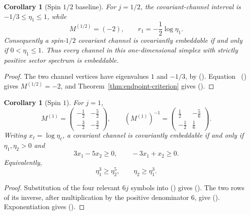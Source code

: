 \documentclass[twoside,10pt]{article}
\numberwithin{equation}{section}
\theoremstyle{slbody}
\newtheorem{corollary}[theorem]{Corollary}
\theoremstyle{definition}
\theoremstyle{remark}
\renewcommand{\eqref}[1]{%
  \textup{{\normalfont(\oldstylenums{\ref{#1}}}\normalfont)}}
\begin{document}
\begin{corollary}[Spin \(1/2\) baseline]\label{cor:spin-one-half}
For \(j=1/2\), the covariant-channel interval is
\(-1/3\leq\eta_1\leq1\), while
\begin{equation}\label{eq:spin-one-half-criterion}
 M^{(1/2)}=(-2),\qquad
 r_1=-\frac12\log\eta_1.
\end{equation}
Consequently a spin-\(1/2\) covariant channel is covariantly
embeddable if and only if \(0<\eta_1\leq1\).  Thus every channel in
this one-dimensional simplex with strictly positive sector spectrum is
embeddable.
\end{corollary}

\begin{proof}
The two channel vertices have eigenvalues \(1\) and \(-1/3\), by
\eqref{eq:vertex-eigenvalues}.  Equation~\eqref{eq:M-definition}
gives \(M^{(1/2)}=-2\), and Theorem~\ref{thm:endpoint-criterion}
gives \eqref{eq:spin-one-half-criterion}.
\end{proof}

\begin{corollary}[Spin \(1\)]\label{cor:spin-one}
For \(j=1\),
\begin{equation}\label{eq:M-spin-one}
 M^{(1)}=
 \begin{pmatrix}
 -\tfrac12&-\tfrac52\\
 -\tfrac32&-\tfrac32
 \end{pmatrix},
 \qquad
 (M^{(1)})^{-1}=
 \begin{pmatrix}
 \tfrac12&-\tfrac56\\
 -\tfrac12&\tfrac16
 \end{pmatrix}.
\end{equation}
Writing \(x_\ell=\log\eta_\ell\), a covariant channel is covariantly
embeddable if and only if \(\eta_1,\eta_2>0\) and
\begin{equation}\label{eq:spin-one-facets}
 3x_1-5x_2\geq0,
 \qquad -3x_1+x_2\geq0.
\end{equation}
Equivalently,
\begin{equation}\label{eq:spin-one-multiplicative}
 \eta_1^3\geq\eta_2^5,
 \qquad \eta_2\geq\eta_1^3.
\end{equation}
\end{corollary}

\begin{proof}
Substitution of the four relevant \(6j\) symbols into
\eqref{eq:M-definition} gives \eqref{eq:M-spin-one}.  The two rows of
its inverse, after multiplication by the positive denominator \(6\),
give \eqref{eq:spin-one-facets}.  Exponentiation gives
\eqref{eq:spin-one-multiplicative}.
\end{proof}
\end{document}
